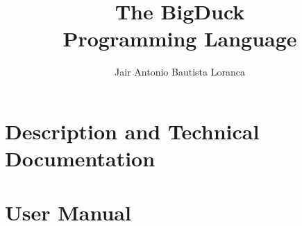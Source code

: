 \documentclass{report}
\title{The BigDuck\\Programming Language}
\author{Jair  Antonio Bautista Loranca}
\begin{document}
\maketitle
\tableofcontents

\part{Description and Technical Documentation}





%


\part{User Manual}


\end{document}
